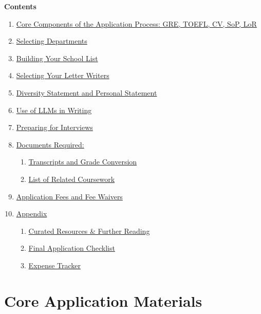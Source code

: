\documentclass[11pt, letterpaper]{article}
\begin{document}
\begin{contentsbox}
{\large\bfseries\color{cdark} Contents}
\vspace{6pt}

{\normalsize
\begin{enumerate}[leftmargin=*, itemsep=3pt, label={\color{cprimary}\bfseries\arabic*.}]
    \item \hyperref[sec:core]{Core Components of the Application Process: GRE, TOEFL, CV, SoP, LoR}
    \item \hyperref[sec:departments]{Selecting Departments}
    \item \hyperref[sec:schoollist]{Building Your School List}
    \item \hyperref[sec:letterwriters]{Selecting Your Letter Writers}
    \item \hyperref[sec:diversity]{Diversity Statement and Personal Statement}
    \item \hyperref[sec:llm]{Use of LLMs in Writing}
    \item \hyperref[sec:interviews]{Preparing for Interviews}
    \item \hyperref[sec:documents]{Documents Required:}
    \begin{enumerate}[label={\color{cprimary}\bfseries\arabic{enumi}.\arabic*.}, itemsep=2pt]
        \item \hyperref[sec:transcripts]{Transcripts and Grade Conversion}
        \item \hyperref[sec:coursework]{List of Related Coursework}
    \end{enumerate}
    \item \hyperref[sec:fees]{Application Fees and Fee Waivers}
    \item \hyperref[sec:appendix]{Appendix}
    \begin{enumerate}[label={\color{cprimary}\bfseries\arabic{enumi}.\arabic*.}, itemsep=2pt]
        \item \hyperref[sec:resources]{Curated Resources \& Further Reading}
        \item \hyperref[sec:checklist]{Final Application Checklist}
        \item \hyperref[sec:expenses]{Expense Tracker}
    \end{enumerate}
\end{enumerate}
}
\end{contentsbox}

\newpage

\section{Core Application Materials}\label{sec:core}
\end{document}
